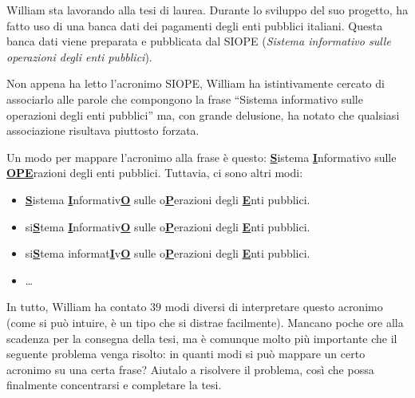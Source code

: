 \usepackage{xcolor}
\usepackage{afterpage}
\usepackage{pifont,mdframed}
\usepackage[bottom]{footmisc}

\makeatletter
\gdef\this@inputfilename{input.txt}
\gdef\this@outputfilename{output.txt}
\makeatother

\newcommand{\inputfile}{\texttt{input.txt}}
\newcommand{\outputfile}{\texttt{output.txt}}

\newenvironment{warning}
  {\par\begin{mdframed}[linewidth=2pt,linecolor=gray]%
    \begin{list}{}{\leftmargin=1cm
                   \labelwidth=\leftmargin}\item[\Large\ding{43}]}
  {\end{list}\end{mdframed}\par}

\newcommand{\enfatizza}[1]{\textbf{\underline{#1}}}

William sta lavorando alla tesi di laurea. Durante lo sviluppo del suo progetto, ha fatto uso di una banca dati dei pagamenti degli enti pubblici italiani. Questa banca dati viene preparata e pubblicata dal SIOPE (\textit{Sistema informativo sulle operazioni degli enti pubblici}).

Non appena ha letto l'acronimo SIOPE, William ha istintivamente cercato di associarlo alle parole che compongono la frase ``Sistema informativo sulle operazioni degli enti pubblici'' ma, con grande delusione, ha notato che qualsiasi associazione risultava piuttosto forzata.

Un modo per mappare l'acronimo alla frase è questo: \enfatizza{S}istema \enfatizza{I}nformativo sulle \enfatizza{OPE}razioni degli enti pubblici. Tuttavia, ci sono altri modi:
\begin{itemize}
  \item \enfatizza{S}istema \enfatizza{I}nformativ\enfatizza{O} sulle o\enfatizza{P}erazioni degli \enfatizza{E}nti pubblici.
  \item si\enfatizza{S}tema \enfatizza{I}nformativ\enfatizza{O} sulle o\enfatizza{P}erazioni degli \enfatizza{E}nti pubblici.
  \item si\enfatizza{S}tema informat\enfatizza{I}v\enfatizza{O} sulle o\enfatizza{P}erazioni degli \enfatizza{E}nti pubblici.
  \item \dots
\end{itemize}

In tutto, William ha contato $39$ modi diversi di interpretare questo acronimo (come si può intuire, è un tipo che si distrae facilmente). Mancano poche ore alla scadenza per la consegna della tesi, ma è comunque molto più importante che il seguente problema venga risolto: in quanti modi si può mappare un certo acronimo su una certa frase? Aiutalo a risolvere il problema, così che possa finalmente concentrarsi e completare la tesi.

